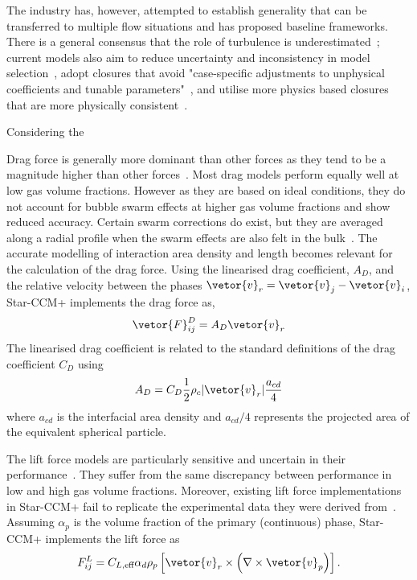 The industry has, however, attempted to establish generality that can be transferred 
 to multiple flow situations and has proposed baseline frameworks. There is a general consensus
 that the role of turbulence is underestimated~\cite{colomboBenchmarkingCFDModelling};
 current models also aim to reduce 
 uncertainty and inconsistency in model selection~\cite{colomboBenchmarkingCFDModelling}, 
 adopt closures that avoid "case-specific adjustments to unphysical coefficients and 
 tunable parameters"~\cite{sugrueRobustMomentumClosure}, and utilise more
 physics based closures that are more physically consistent~\cite{liaoEulerianModellingTurbulent2018,colomboBenchmarkingCFDModelling}.

Considering the 

Drag force is generally more dominant than other forces as they tend to be a magnitude
 higher than other forces~\cite{tas-koehlerCriticalAnalysisDrag2021a}. Most drag models perform 
 equally well at low gas volume fractions. However as they are based on ideal conditions, 
 they do not account for bubble swarm effects at higher gas volume fractions and show reduced 
 accuracy. Certain swarm corrections do exist, but they are averaged along a radial profile when
 the swarm effects are also felt in the bulk~\cite{sugrueRobustMomentumClosure, sugrueAssessmentSimplifiedSet2017,colomboBenchmarkingCFDModelling}.
 The accurate modelling of interaction area density and length becomes relevant for the calculation
 of the drag force. 
 Using the linearised drag coefficient, $A_{D}$, and the relative velocity between the phases
 $\vetor{v}_{r} = \vetor{v}_{j} - \vetor{v}_{i}$, Star-CCM+ implements the drag force as,
 \begin{equation}
    \vetor{F}_{ij}^{D} = A_{D}\vetor{v}_{r}
 \end{equation}
 The linearised drag coefficient is related to the standard definitions of the drag 
 coefficient $C_{D}$ using
 \begin{equation}
    A_{D} = C_{D} \frac{1}{2} \rho_{c} |\vetor{v}_{r}| \frac{a_{cd}}{4}
 \end{equation}
 where $a_{cd}$ is the interfacial area density and $a_{cd}/4$ represents the projected area of
 the equivalent spherical particle. 

The lift force models are particularly sensitive and uncertain in their performance~\cite{sugrueAssessmentSimplifiedSet2017}.
 They suffer from the same discrepancy between performance in low and 
 high gas volume fractions. Moreover, existing 
 lift force implementations in Star-CCM+ fail to replicate the experimental data
 they were derived from~\cite{sugrueRobustMomentumClosure}.
 Assuming $\alpha_{p}$ is the volume fraction of the primary (continuous)
 phase, Star-CCM+ implements the lift force as
 \begin{equation}
    F_{ij}^{L} = C_{L,\text{eff}} \alpha_{d} \rho_{p} 
    \left[\vetor{v}_{r} \times \left(\nabla \times \vetor{v}_{p}\right)\right].
 \end{equation} 

